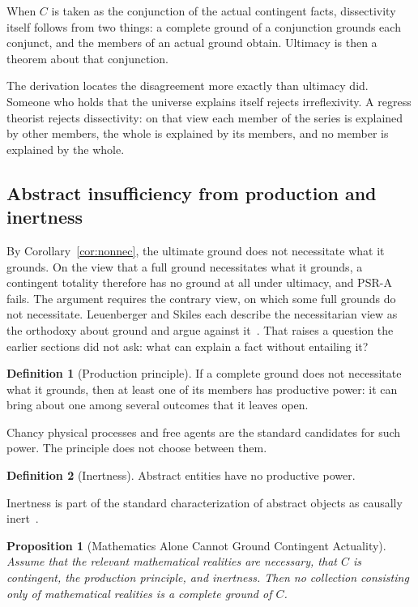 \documentclass[11pt,letterpaper]{article}
\theoremstyle{plain}
\newtheorem{proposition}{Proposition}
\theoremstyle{definition}
\newtheorem{definition}{Definition}
\begin{document}
When $C$ is taken as the conjunction of the actual contingent facts, dissectivity itself follows from two things: a complete ground of a conjunction grounds each conjunct, and the members of an actual ground obtain. Ultimacy is then a theorem about that conjunction.

The derivation locates the disagreement more exactly than ultimacy did. Someone who holds that the universe explains itself rejects irreflexivity. A regress theorist rejects dissectivity: on that view each member of the series is explained by other members, the whole is explained by its members, and no member is explained by the whole.

\subsection{Abstract insufficiency from production and inertness}

By Corollary~\ref{cor:nonnec}, the ultimate ground does not necessitate what it grounds. On the view that a full ground necessitates what it grounds, a contingent totality therefore has no ground at all under ultimacy, and PSR-A fails. The argument requires the contrary view, on which some full grounds do not necessitate. Leuenberger and Skiles each describe the necessitarian view as the orthodoxy about ground and argue against it~\cite{leuenberger,skiles}. That raises a question the earlier sections did not ask: what can explain a fact without entailing it?

\begin{definition}[Production principle]\label{def:pp}
If a complete ground does not necessitate what it grounds, then at least one of its members has productive power: it can bring about one among several outcomes that it leaves open.
\end{definition}

Chancy physical processes and free agents are the standard candidates for such power. The principle does not choose between them.

\begin{definition}[Inertness]\label{def:inert}
Abstract entities have no productive power.
\end{definition}

Inertness is part of the standard characterization of abstract objects as causally inert~\cite{linnebo,balaguer}.

\begin{proposition}[Mathematics Alone Cannot Ground Contingent Actuality]\label{prop:mathalone}
Assume that the relevant mathematical realities are necessary, that $C$ is contingent, the production principle, and inertness. Then no collection consisting only of mathematical realities is a complete ground of $C$.
\end{proposition}
\end{document}
